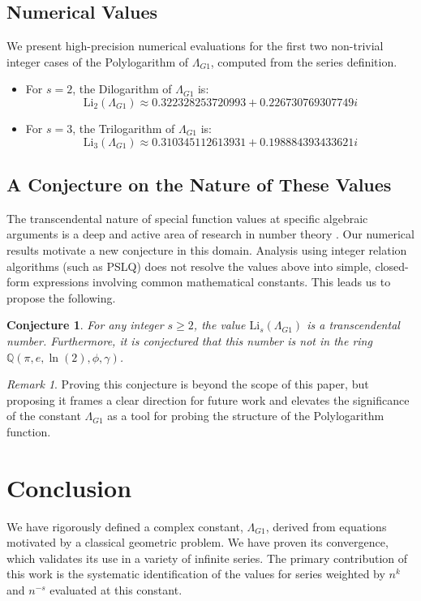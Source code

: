 \documentclass{amsart}
\theoremstyle{plain}
\newtheorem{conjecture}[theorem]{Conjecture}
\theoremstyle{definition}
\theoremstyle{remark}
\newtheorem*{remark}{Remark}
\newcommand{\LambdaG}{\Lambda_{G1}}
\begin{document}
\subsection{Numerical Values}
We present high-precision numerical evaluations for the first two non-trivial integer cases of the Polylogarithm of $\LambdaG$, computed from the series definition.
\begin{itemize}
    \item For $s=2$, the Dilogarithm of $\LambdaG$ is:
    $$ \mathrm{Li}_2(\LambdaG) \approx 0.322328253720993 + 0.226730769307749i $$
    \item For $s=3$, the Trilogarithm of $\LambdaG$ is:
    $$ \mathrm{Li}_3(\LambdaG) \approx 0.310345112613931 + 0.198884393433621i $$
\end{itemize}

\subsection{A Conjecture on the Nature of These Values}
The transcendental nature of special function values at specific algebraic arguments is a deep and active area of research in number theory \cite{Lewin}. Our numerical results motivate a new conjecture in this domain. Analysis using integer relation algorithms (such as PSLQ) does not resolve the values above into simple, closed-form expressions involving common mathematical constants. This leads us to propose the following.

\begin{conjecture}
For any integer $s \ge 2$, the value $\mathrm{Li}_s(\LambdaG)$ is a transcendental number. Furthermore, it is conjectured that this number is not in the ring $\mathbb{Q}(\pi, e, \ln(2), \phi, \gamma)$.
\end{conjecture}
\begin{remark}
Proving this conjecture is beyond the scope of this paper, but proposing it frames a clear direction for future work and elevates the significance of the constant $\LambdaG$ as a tool for probing the structure of the Polylogarithm function.
\end{remark}

\section{Conclusion}
We have rigorously defined a complex constant, $\LambdaG$, derived from equations motivated by a classical geometric problem. We have proven its convergence, which validates its use in a variety of infinite series. The primary contribution of this work is the systematic identification of the values for series weighted by $n^k$ and $n^{-s}$ evaluated at this constant.
\end{document}
